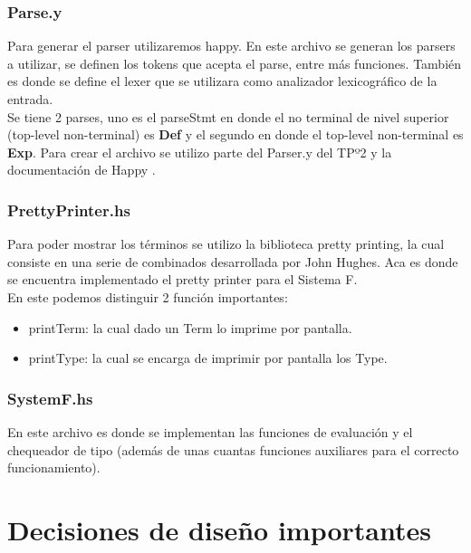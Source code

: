 \documentclass[12pt, titlepage, a4paper]{article}
\begin{document}
\subsubsection{Parse.y}
Para generar el parser utilizaremos happy. En este archivo se generan los parsers a utilizar, se definen los tokens que acepta el parse, 
entre más funciones. También es donde se define el lexer que se utilizara como analizador lexicográfico de la entrada. \\ 

Se tiene 2 parses, uno es el parseStmt en donde el no terminal de nivel superior (top-level non-terminal) es \textbf{Def} y el 
segundo en donde el top-level non-terminal es \textbf{Exp}. 
Para crear el archivo se utilizo parte del Parser.y del TPº2 \cite{tp2:lambdaCalculoSimpleTipado} y la documentación de Happy \cite{haskellHappy}. \\

\subsubsection{PrettyPrinter.hs}
Para poder mostrar los términos se utilizo la biblioteca pretty printing, la cual consiste en una serie de combinados desarrollada por John Hughes. Aca es 
donde se encuentra implementado el pretty printer para el Sistema F. \\
En este podemos distinguir 2 función importantes:
\begin{itemize}[label=$\bullet$]
  \item {printTerm: la cual dado un Term lo imprime por pantalla.}
  \item {printType: la cual se encarga de imprimir por pantalla los Type.}
\end{itemize}

\subsubsection{SystemF.hs}
En este archivo es donde se implementan las funciones de evaluación y el chequeador de tipo (además de unas cuantas funciones auxiliares 
para el correcto funcionamiento).

\section{Decisiones de diseño importantes}
\end{document}
